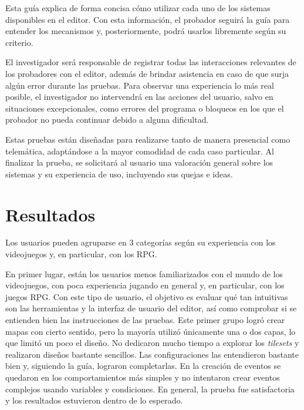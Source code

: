Esta guía explica de forma concisa cómo utilizar cada uno de los sistemas disponibles en el editor. Con esta información, el probador seguirá la guía para entender los mecanismos y, posteriormente, podrá usarlos libremente según su criterio.

\medskip

El investigador será responsable de registrar todas las interacciones relevantes de los probadores con el editor, además de brindar asistencia en caso de que surja algún error durante las pruebas. Para observar una experiencia lo más real posible, el investigador no intervendrá en las acciones del usuario, salvo en situaciones excepcionales, como errores del programa o bloqueos en los que el probador no pueda continuar debido a alguna dificultad.

\smallskip

Estas pruebas están diseñadas para realizarse tanto de manera presencial como telemática, adaptándose a la mayor comodidad de cada caso particular. Al finalizar la prueba, se solicitará al usuario una valoración general sobre los sistemas y su experiencia de uso, incluyendo sus quejas e ideas.

\section{Resultados}

Los usuarios pueden agruparse en 3 categorías según su experiencia con los videojuegos y, en particular, con los RPG.

\smallskip 

En primer lugar, están los usuarios menos familiarizados con el mundo de los videojuegos, con poca experiencia jugando en general y, en particular, con los juegos RPG. Con este tipo de usuario, el objetivo es evaluar qué tan intuitivas son las herramientas y la interfaz de usuario del editor, así como comprobar si se entienden bien las instrucciones de las pruebas. Este primer grupo logró crear mapas con cierto sentido, pero la mayoría utilizó únicamente una o dos capas, lo que limitó un poco el diseño. No dedicaron mucho tiempo a explorar los \textit{tilesets} y realizaron diseños bastante sencillos. Las configuraciones las entendieron bastante bien y, siguiendo la guía, lograron completarlas. En la creación de eventos se quedaron en los comportamientos más simples y no intentaron crear eventos complejos usando variables y condiciones. En general, la prueba fue satisfactoria y los resultados estuvieron dentro de lo esperado.

